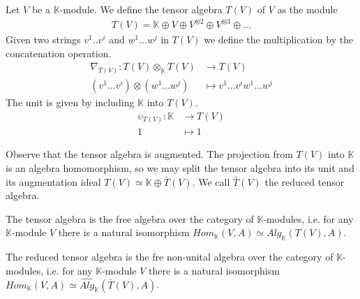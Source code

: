 \documentclass[../thesis.tex]{subfiles}
\begin{document}
            \begin{definition}
                Let $V$ be a $\mathbb{K}$-module. We define the tensor algebra $T(V)$ of $V$ as the module
                \begin{align*}
                    T(V) = \mathbb{K}\oplus V\oplus V^{\otimes 2} \oplus V^{\otimes 3} \oplus ...
                \end{align*}
                Given two strings $v^1..v^i$ and $w^1...w^j$ in $T(V)$ we define the multiplication by the concatenation operation.
                \begin{align*}
                    \nabla_{T(V)} : T(V)\otimes_{\mathbb{K}} T(V) & \rightarrow T(V) \\
                    (v^1...v^i)\otimes(w^1...w^j) & \mapsto v^1...v^iw^1...w^j
                \end{align*}
                The unit is given by including $\mathbb{K}$ into $T(V)$.
                \begin{align*}
                    \upsilon_{T(V)} : \mathbb{K} & \rightarrow T(V) \\
                    1 & \mapsto 1
                \end{align*}
            \end{definition}

            Observe that the tensor algebra is augmented. The projection from $T(V)$ into $\mathbb{K}$ is an algebra homomorphism, so we may split the tensor algebra into its unit and its augmentation ideal $T(V) \simeq \mathbb{K}\oplus\bar{T}(V)$. We call $\bar{T}(V)$ the reduced tensor algebra.

            \begin{proposition}
                The tensor algebra is the free algebra over the category of $\mathbb{K}$-modules, i.e. for any $\mathbb{K}$-module $V$ there is a natural isomorphism $Hom_{\mathbb{K}}(V,A)\simeq Alg_{\mathbb{K}}(T(V),A)$.

                The reduced tensor algebra is the fre non-unital algebra over the category of $\mathbb{K}$-modules, i.e. for any $\mathbb{K}$-module $V$ there is a natural isomorphism $Hom_{\mathbb{K}}(V,A)\simeq \widehat{Alg}_{\mathbb{K}}(\bar{T}(V),A)$.
            \end{proposition}
\end{document}
